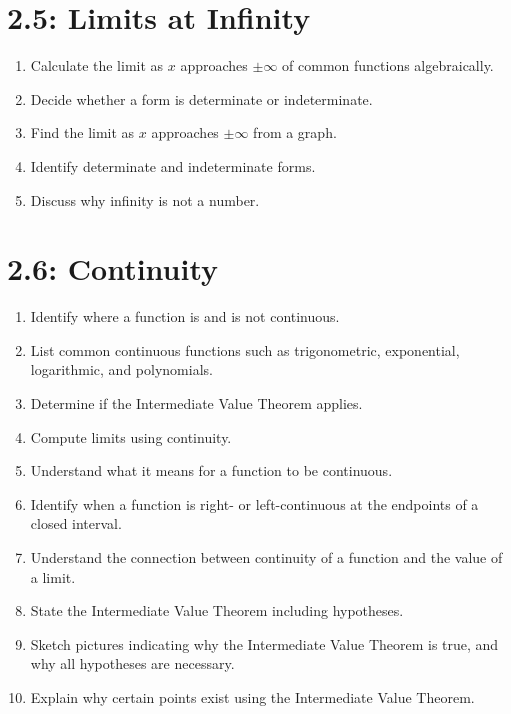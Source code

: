 \documentclass[11pt]{article}
\begin{document}
\section*{2.5: Limits at Infinity}
\begin{enumerate}
	\item Calculate the limit as $x$ approaches $\pm \infty$ of common functions algebraically.
	\item Decide whether a form is determinate or indeterminate.
	\item Find the limit as $x$ approaches $\pm \infty$ from a graph.
	\item Identify determinate and indeterminate forms.
	\item Discuss why infinity is not a number.
\end{enumerate}


\section*{2.6: Continuity}
\begin{enumerate}
	\item Identify where a function is and is not continuous.
	\item List common continuous functions such as trigonometric, exponential, logarithmic, and polynomials.
	\item Determine if the Intermediate Value Theorem applies.
	\item Compute limits using continuity.
	\item Understand what it means for a function to be continuous.
	\item Identify when a function is right- or left-continuous at the endpoints of a closed interval.
	\item Understand the connection between continuity of a function and the value of a limit.
	\item State the Intermediate Value Theorem including hypotheses.
	\item Sketch pictures indicating why the Intermediate Value Theorem is true, and why all hypotheses are necessary.
        \item   Explain why certain points exist using the Intermediate Value Theorem.
\end{enumerate}
\end{document}

